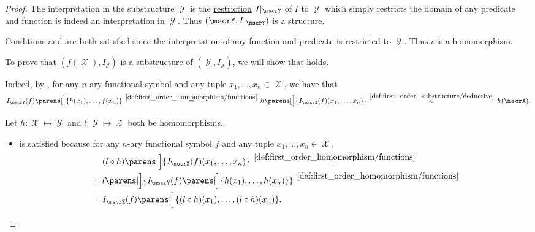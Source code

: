 \begin{proof}
   The interpretation in the substructure \( \mscrY \) is the \hyperref[def:function/extension]{restriction} \( I\restr_\mscrY \) of \( I \) to \( \mscrY \) which simply restricts the domain of any predicate and function is indeed an interpretation in \( \mscrY \). Thus \( (\mscrY, I\restr_\mscrY) \) is a structure.

  Conditions  and  are both satisfied since the interpretation of any function and predicate is restricted to \( \mscrY \). Thus \( \iota \) is a homomorphism.

   To prove that \( (f(\mscrX), I_\mscrY) \) is a substructure of \( (\mscrY, I_\mscrY) \), we will show that  holds.

  Indeed, by , for any \( n \)-ary functional symbol and any tuple \( {x_1, \ldots, x_n \in \mscrX} \), we have that
  \begin{equation*}
    I_\mscrY(f) \parens[\Big]{ h(x_1), \ldots, f(x_n) }
    \reloset {\ref{def:first_order_homomorphism/functions}} =
    h\parens[\Big]{ I_\mscrX(f)(x_1, \ldots, x_n) }
    \reloset {\ref{def:first_order_substructure/deductive}} \in
    h(\mscrX).
  \end{equation*}

   Let \( h: \mscrX \mapsto \mscrY \) and \( l: \mscrY \mapsto \mscrZ \) both be homomorphisms.

  \begin{itemize}
    \item {} is satisfied because for any \( n \)-ary functional symbol \( f \) and any tuple \( x_1, \ldots, x_n \in \mscrX \),
    \begin{align*}
      &\phantom{{}={}}
      (l \bincirc h) \parens[\Big]{ I_\mscrX(f)(x_1, \ldots, x_n) }
      \reloset {\ref{def:first_order_homomorphism/functions}} = \\ &=
      l\parens[\Big]{ I_\mscrY(f) \parens[\Big]{ h(x_1), \ldots, h(x_n) } }
      \reloset {\ref{def:first_order_homomorphism/functions}} = \\ &=
      I_{\mscrZ}(f) \parens[\Big]{ (l \bincirc h)(x_1), \ldots, (l \bincirc h)(x_n) }.
    \end{align*}


\end{itemize}
\end{proof}
